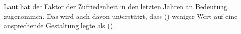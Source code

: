 Laut \citeauthor{barnumUsabilityTesting2021} \cite{barnumUsabilityTesting2021} hat der Faktor der Zufriedenheit in den letzten Jahren an Bedeutung zugenommen. Das wird auch davon unterstützt, dass \citeauthor{nielsenUsabilityEngineering1994} (\citeyear{nielsenUsabilityEngineering1994}) weniger Wert auf eine ansprechende Gestaltung legte als \citeauthor{quesenberyDimensionsUsability2003} (\citeyear{quesenberyDimensionsUsability2003}).
